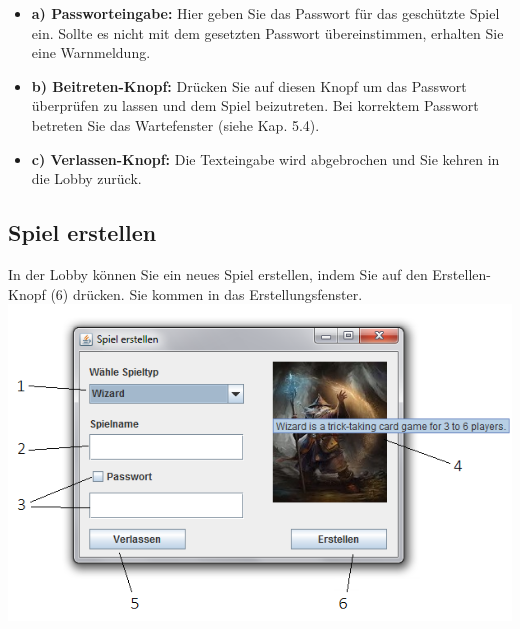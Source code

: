 \documentclass[titlepage,10pt,a4paper]{article}
\begin{document}
\begin{itemize}
		\item \textbf{a) Passworteingabe:} Hier geben Sie das Passwort für das geschützte Spiel ein. Sollte es nicht mit dem gesetzten Passwort übereinstimmen, erhalten Sie eine Warnmeldung.
		\item \textbf{b) Beitreten-Knopf:} Drücken Sie auf diesen Knopf um das Passwort überprüfen zu lassen und dem Spiel beizutreten. Bei korrektem Passwort betreten Sie das \gls{Wartefenster} (siehe Kap. 5.4).
		\item \textbf{c) Verlassen-Knopf:} Die Texteingabe wird abgebrochen und Sie kehren in die \gls{Lobby} zurück.
\end{itemize}

\subsection{Spiel erstellen}
In der Lobby können Sie ein neues Spiel erstellen, indem Sie auf den Erstellen-Knopf (6)  drücken. Sie kommen in das \gls{Erstellungsfenster}.\\
\includegraphics[width=\textwidth]{Erstellungs-Fenster}
\end{document}
